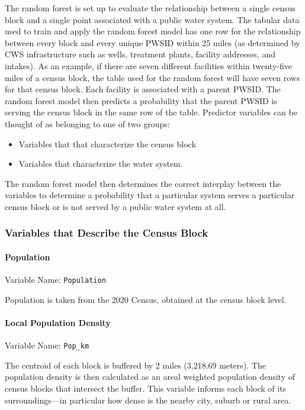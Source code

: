 \documentclass[
  letterpaper,
  DIV=11,
  numbers=noendperiod,
  oneside]{scrartcl}
\let\oldparagraph\paragraph
\renewcommand{\paragraph}[1]{\oldparagraph{#1}\mbox{}}
\providecommand{\tightlist}{%
  \setlength{\itemsep}{0pt}\setlength{\parskip}{0pt}}\usepackage{longtable,booktabs,array}
\begin{document}
The random forest is set up to evaluate the relationship between a
single census block and a single point associated with a public water
system. The tabular data used to train and apply the random forest model
has one row for the relationship between every block and every unique
PWSID within 25 miles (as determined by CWS infrastructure such as
wells, treatment plants, facility addresses, and intakes). As an
example, if there are seven different facilities within twenty-five
miles of a census block, the table used for the random forest will have
seven rows for that census block. Each facility is associated with a
parent PWSID. The random forest model then predicts a probability that
the parent PWSID is serving the census block in the same row of the
table. Predictor variables can be thought of as belonging to one of two
groups:

\begin{itemize}
\tightlist
\item
  Variables that that characterize the census block
\item
  Variables that characterize the water system.
\end{itemize}

The random forest model then determines the correct interplay between
the variables to determine a probability that a particular system serves
a particular census block or is not served by a public water system at
all.

\subsubsection{Variables that Describe the Census
Block}\label{variables-that-describe-the-census-block}

\paragraph{Population}\label{population}

Variable Name: \texttt{Population}

Population is taken from the 2020 Census, obtained at the census block
level.

\paragraph{Local Population Density}\label{local-population-density}

Variable Name: \texttt{Pop\_km}

The centroid of each block is buffered by 2 miles (3,218.69 meters). The
population density is then calculated as an areal weighted population
density of census blocks that intersect the buffer. This variable
informs each block of its surroundings---in particular how dense is the
nearby city, suburb or rural area.
\end{document}
